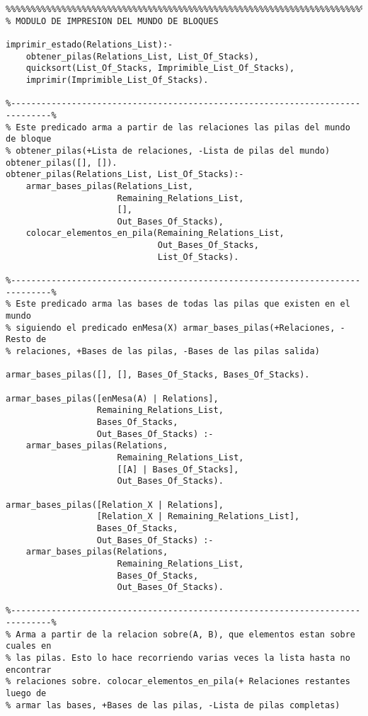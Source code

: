 \documentclass[a4paper,12pt]{report}
\begin{document}
\begin{footnotesize}
\begin{verbatim}
%%%%%%%%%%%%%%%%%%%%%%%%%%%%%%%%%%%%%%%%%%%%%%%%%%%%%%%%%%%%%%%%%%%%%%%%%%%%%%%%
% MODULO DE IMPRESION DEL MUNDO DE BLOQUES

imprimir_estado(Relations_List):-
    obtener_pilas(Relations_List, List_Of_Stacks),
    quicksort(List_Of_Stacks, Imprimible_List_Of_Stacks),
    imprimir(Imprimible_List_Of_Stacks).
    
%------------------------------------------------------------------------------%
% Este predicado arma a partir de las relaciones las pilas del mundo de bloque
% obtener_pilas(+Lista de relaciones, -Lista de pilas del mundo)   
obtener_pilas([], []).
obtener_pilas(Relations_List, List_Of_Stacks):-
    armar_bases_pilas(Relations_List, 
                      Remaining_Relations_List, 
                      [], 
                      Out_Bases_Of_Stacks),
    colocar_elementos_en_pila(Remaining_Relations_List, 
                              Out_Bases_Of_Stacks, 
                              List_Of_Stacks).

%------------------------------------------------------------------------------%
% Este predicado arma las bases de todas las pilas que existen en el mundo 
% siguiendo el predicado enMesa(X) armar_bases_pilas(+Relaciones, -Resto de 
% relaciones, +Bases de las pilas, -Bases de las pilas salida)

armar_bases_pilas([], [], Bases_Of_Stacks, Bases_Of_Stacks).

armar_bases_pilas([enMesa(A) | Relations], 
                  Remaining_Relations_List, 
                  Bases_Of_Stacks, 
                  Out_Bases_Of_Stacks) :-
    armar_bases_pilas(Relations, 
                      Remaining_Relations_List, 
                      [[A] | Bases_Of_Stacks], 
                      Out_Bases_Of_Stacks).

armar_bases_pilas([Relation_X | Relations], 
                  [Relation_X | Remaining_Relations_List], 
                  Bases_Of_Stacks, 
                  Out_Bases_Of_Stacks) :-
    armar_bases_pilas(Relations, 
                      Remaining_Relations_List, 
                      Bases_Of_Stacks, 
                      Out_Bases_Of_Stacks).

%------------------------------------------------------------------------------%
% Arma a partir de la relacion sobre(A, B), que elementos estan sobre cuales en 
% las pilas. Esto lo hace recorriendo varias veces la lista hasta no encontrar 
% relaciones sobre. colocar_elementos_en_pila(+ Relaciones restantes luego de 
% armar las bases, +Bases de las pilas, -Lista de pilas completas)


\end{verbatim}
\end{footnotesize}
\end{document}
